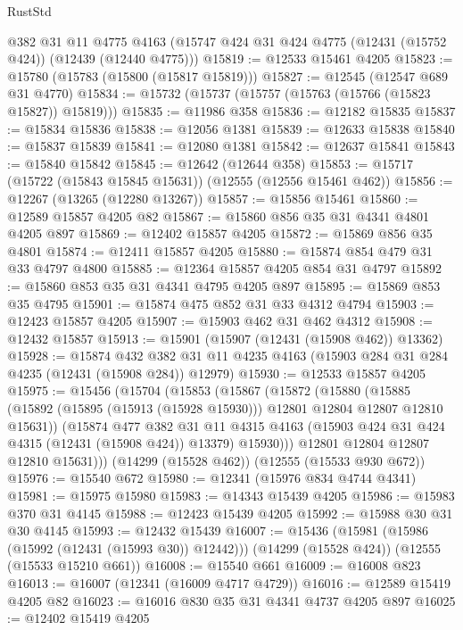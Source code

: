 \begin{lexlean}{RustStd}
\begin{coremodule}
    @382
    @31
    @11
    @4775
    @4163
    (@15747 @424 @31 @424 @4775 (@12431 (@15752 @424)) (@12439 (@12440 @4775)))
@15819 := @12533 @15461 @4205
@15823 := @15780 (@15783 (@15800 (@15817 @15819)))
@15827 := @12545 (@12547 @689 @31 @4770)
@15834 := @15732 (@15737 (@15757 (@15763 (@15766 (@15823 @15827)) @15819)))
@15835 := @11986 @358
@15836 := @12182 @15835
@15837 := @15834 @15836
@15838 := @12056 @1381
@15839 := @12633 @15838
@15840 := @15837 @15839
@15841 := @12080 @1381
@15842 := @12637 @15841
@15843 := @15840 @15842
@15845 := @12642 (@12644 @358)
@15853 := @15717 (@15722 (@15843 @15845 @15631)) (@12555 (@12556 @15461 @462))
@15856 := @12267 (@13265 (@12280 @13267))
@15857 := @15856 @15461
@15860 := @12589 @15857 @4205 @82
@15867 := @15860 @856 @35 @31 @4341 @4801 @4205 @897
@15869 := @12402 @15857 @4205
@15872 := @15869 @856 @35 @4801
@15874 := @12411 @15857 @4205
@15880 := @15874 @854 @479 @31 @33 @4797 @4800
@15885 := @12364 @15857 @4205 @854 @31 @4797
@15892 := @15860 @853 @35 @31 @4341 @4795 @4205 @897
@15895 := @15869 @853 @35 @4795
@15901 := @15874 @475 @852 @31 @33 @4312 @4794
@15903 := @12423 @15857 @4205
@15907 := @15903 @462 @31 @462 @4312
@15908 := @12432 @15857
@15913 := @15901 (@15907 (@12431 (@15908 @462)) @13362)
@15928 := @15874
    @432
    @382
    @31
    @11
    @4235
    @4163
    (@15903 @284 @31 @284 @4235 (@12431 (@15908 @284)) @12979)
@15930 := @12533 @15857 @4205
@15975 := @15456
    (@15704
      (@15853
        (@15867
          (@15872
            (@15880
              (@15885 (@15892 (@15895 (@15913 (@15928 @15930))) @12801 @12804 @12807 @12810 @15631))
              (@15874
                @477
                @382
                @31
                @11
                @4315
                @4163
                (@15903 @424 @31 @424 @4315 (@12431 (@15908 @424)) @13379)
                @15930)))
          @12801
          @12804
          @12807
          @12810
          @15631)))
    (@14299 (@15528 @462))
    (@12555 (@15533 @930 @672))
@15976 := @15540 @672
@15980 := @12341 (@15976 @834 @4744 @4341)
@15981 := @15975 @15980
@15983 := @14343 @15439 @4205
@15986 := @15983 @370 @31 @4145
@15988 := @12423 @15439 @4205
@15992 := @15988 @30 @31 @30 @4145
@15993 := @12432 @15439
@16007 := @15436
    (@15981 (@15986 (@15992 (@12431 (@15993 @30)) @12442)))
    (@14299 (@15528 @424))
    (@12555 (@15533 @15210 @661))
@16008 := @15540 @661
@16009 := @16008 @823
@16013 := @16007 (@12341 (@16009 @4717 @4729))
@16016 := @12589 @15419 @4205 @82
@16023 := @16016 @830 @35 @31 @4341 @4737 @4205 @897
@16025 := @12402 @15419 @4205

\end{coremodule}
\end{lexlean}
